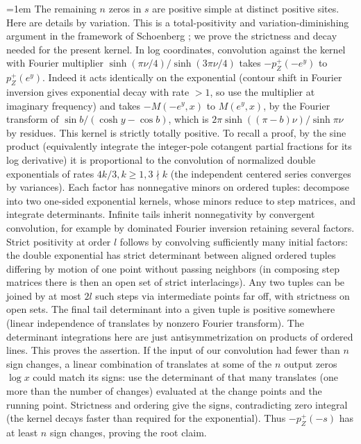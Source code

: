\begingroup\emergencystretch=1em
The remaining \(n\) zeros in \(s\) are positive simple at distinct positive sites. Here are details by variation. This is a total-positivity and variation-diminishing argument in the framework of Schoenberg \cite[Theorem~1 and p.~17]{Schoenberg1947}; we prove the strictness and decay needed for the present kernel. In log coordinates, convolution against the kernel with Fourier multiplier \(\sinh(\pi\nu/4)/\sinh(3\pi\nu/4)\) takes \(-p_Z^+(-e^y)\) to \(p_Z^+(e^y)\). Indeed it acts identically on the exponential (contour shift in Fourier inversion gives exponential decay with rate \(>1\), so use the multiplier at imaginary frequency) and takes \(-M(-e^y,x)\) to \(M(e^y,x)\), by the Fourier transform of \(\sin b/(\cosh y-\cos b)\), which is \(2\pi\sinh((\pi-b)\nu)/\sinh\pi\nu\) by residues. This kernel is strictly totally positive. To recall a proof, by the sine product (equivalently integrate the integer-pole cotangent partial fractions for its log derivative) it is proportional to the convolution of normalized double exponentials of rates \(4k/3, k\ge1, 3\nmid k\) (the independent centered series converges by variances). Each factor has nonnegative minors on ordered tuples: decompose into two one-sided exponential kernels, whose minors reduce to step matrices, and integrate determinants. Infinite tails inherit nonnegativity by convergent convolution, for example by dominated Fourier inversion retaining several factors. Strict positivity at order \(l\) follows by convolving sufficiently many initial factors: the double exponential has strict determinant between aligned ordered tuples differing by motion of one point without passing neighbors (in composing step matrices there is then an open set of strict interlacings). Any two tuples can be joined by at most \(2l\) such steps via intermediate points far off, with strictness on open sets. The final tail determinant into a given tuple is positive somewhere (linear independence of translates by nonzero Fourier transform). The determinant integrations here are just antisymmetrization on products of ordered lines. This proves the assertion. If the input of our convolution had fewer than \(n\) sign changes, a linear combination of translates at some of the \(n\) output zeros \(\log x\) could match its signs: use the determinant of that many translates (one more than the number of changes) evaluated at the change points and the running point. Strictness and ordering give the signs, contradicting zero integral (the kernel decays faster than required for the exponential). Thus \(-p_Z^+(-s)\) has at least \(n\) sign changes, proving the root claim.
\par\endgroup

